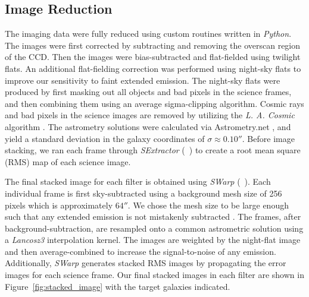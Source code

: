 \documentclass[trackchanges,twocolumn]{aastex62}
\newcommand{\citeth}[1]{(\citeauthor{#1}\ \citeyear{#1})}
\begin{document}
\subsection{Image Reduction}
The imaging data were fully reduced using custom routines written in \emph{Python}. 
The images were first corrected by subtracting and removing the overscan region of the CCD. 
Then the images were bias-subtracted and flat-fielded using twilight flats.
An additional flat-fielding correction was performed using night-sky flats to improve our sensitivity to faint extended emission.  The night-sky flats were produced by first masking out all objects and bad pixels in the science frames, and then combining them using an average sigma-clipping algorithm.
Cosmic rays and bad pixels in the science images are removed by utilizing the \emph{L. A. Cosmic} algorithm \citep{Dokkum2001}.
The astrometry solutions were calculated via Astrometry.net \citep{Lang}, and yield a standard deviation in the galaxy coordinates of $\sigma \approx 0.10''$. Before image stacking, we ran each frame through \emph{SExtractor} \citeth{Bertin} to create a root mean square (RMS) map of each science image.


The final stacked image for each filter is obtained using \emph{SWarp} \citeth{Bertin}.
Each individual frame is first sky-subtracted using a background mesh size of 256 pixels which is approximately $64''$. 
We chose the mesh size to be large enough such that any extended emission is not mistakenly subtracted \citep[e.g.,][]{Battaia_2015}. 
The frames, after background-subtraction, are resampled onto a common astrometric solution using a \textit{Lancosz3} interpolation kernel. 
The images are weighted by the night-flat image and then  average-combined to increase the signal-to-noise of any  emission. Additionally, \emph{SWarp} generates stacked RMS images by propagating the error images for each science frame.
Our final stacked images in each filter are shown in Figure~\ref{fig:stacked_image} with the target galaxies indicated.  
\end{document}
